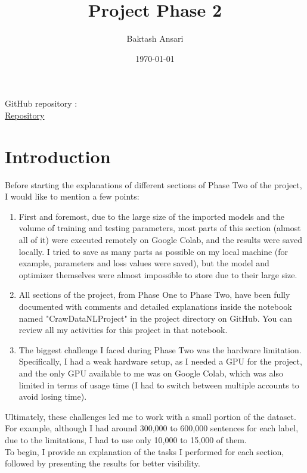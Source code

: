 \documentclass[a4paper]{article}
\title{Project Phase 2}
\author{Baktash Ansari}
\date{\today}
\begin{document}
  

\maketitle

GitHub repository  : \\

\href{https://github.com/baktash81/CS224nProject}{Repository}\\


\section{Introduction}

Before starting the explanations of different sections of Phase Two of the project, I would like to mention a few points:

\begin{enumerate}
  \item First and foremost, due to the large size of the imported models and the volume of training and testing parameters, most parts of this section (almost all of it) were executed remotely on Google Colab, and the results were saved locally. I tried to save as many parts as possible on my local machine (for example, parameters and loss values were saved), but the model and optimizer themselves were almost impossible to store due to their large size.
  \item All sections of the project, from Phase One to Phase Two, have been fully documented with comments and detailed explanations inside the notebook named "CrawDataNLProject" in the project directory on GitHub. You can review all my activities for this project in that notebook.
  \item The biggest challenge I faced during Phase Two was the hardware limitation. Specifically, I had a weak hardware setup, as I needed a GPU for the project, and the only GPU available to me was on Google Colab, which was also limited in terms of usage time (I had to switch between multiple accounts to avoid losing time).
\end{enumerate}

Ultimately, these challenges led me to work with a small portion of the dataset. For example, although I had around 300,000 to 600,000 sentences for each label, due to the limitations, I had to use only 10,000 to 15,000 of them.\\



To begin, I provide an explanation of the tasks I performed for each section, followed by presenting the results for better visibility.\\
\end{document}
